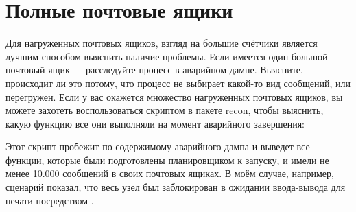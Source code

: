 \documentclass[11pt, oneside]{book}   	%
\begin{document}
\section{Полные почтовые ящики}
\label{sec:crash-full-mailboxes}

Для нагруженных почтовых ящиков, взгляд на большие счётчики является лучшим способом выяснить наличие проблемы. Если имеется один большой почтовый ящик --- расследуйте процесс в аварийном дампе. Выясните, происходит ли это потому, что процесс не выбирает какой-то вид сообщений, или перегружен. Если у вас окажется множество нагруженных почтовых ящиков, вы можете захотеть воспользоваться скриптом  в пакете recon, чтобы выяснить, какую функцию все они выполняли на момент аварийного завершения:


Этот скрипт пробежит по содержимому аварийного дампа и выведет все функции, которые были подготовлены планировщиком к запуску, и имели не менее 10.000 сообщений в своих почтовых ящиках. В моём случае, например, сценарий показал, что весь узел был заблокирован в ожидании ввода-вывода для печати посредством .
\end{document}
